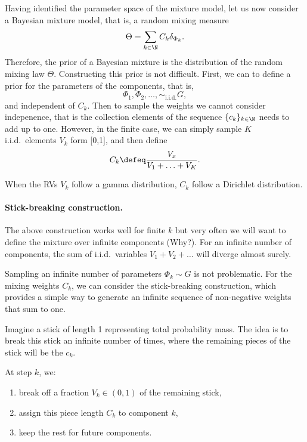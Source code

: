 Having identified the parameter space of the mixture model, let us now consider a Bayesian mixture model, that is, a random mixing measure 
\begin{equation}
    \Theta = \sum_{k\in\N} C_k \delta_{\Phi_k}.
\end{equation}
Therefore, the prior of a Bayesian mixture is the distribution of the random mixing law $\Theta$. Constructing this prior is not difficult. First, we can to define a prior for the parameters of the components, that is, 
\begin{equation}
    \Phi_1,\Phi_2,\ldots, \sim_\text{i.i.d.} G,
\end{equation}
and independent of $C_k$. Then to sample the weights we cannot consider indepenence, that is the collection elements of the sequence $\{c_k\}_{k\in\N}$ needs to add up to one. However, in the finite case, we can simply sample $K$ i.i.d.~elements $V_k$ form [0,1], and then define
\begin{equation}
    C_k \defeq \frac{V_x}{V_1+\ldots+V_K}.    
\end{equation}

\begin{remark}
    When the RVs $V_k$ follow a gamma distribution, $C_k$ follow a Dirichlet distribution. 
\end{remark}

\paragraph{Stick-breaking construction.} The above construction works well for finite $k$ but very often we will want to define the mixture over infinite components (Why?). For an infinite number of components, the sum of i.i.d.~variables $V_1 + V_2 + \ldots$ will diverge almost surely. 

Sampling an infinite number of parameters $\Phi_k\sim G$ is not problematic. For the mixing weights $C_k$, we can consider the stick-breaking construction, which provides a simple way to generate an infinite sequence of non-negative weights that sum to one.

Imagine a stick of length 1 representing total probability mass. The idea is to break this stick an infinite number of times, where the remaining pieces of the stick will be the $c_k$.

At step $k$, we:
\begin{enumerate}
  \item break off a fraction $V_k \in (0,1)$ of the remaining stick,
  \item assign this piece length $C_k$ to component $k$,
  \item keep the rest for future components.
\end{enumerate}

